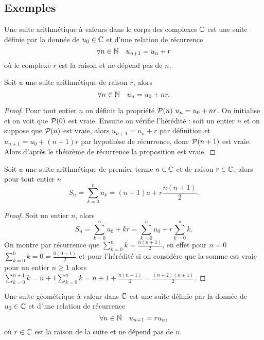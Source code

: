 \subsection{Exemples}
\begin{defdef}
  Une suite arithmétique à valeurs dans le corps des complexes $\C$ est une suite définie par la donnée de $u_0\in\C$ et d'une relation de récurrence 
  \begin{equation}
    \forall n \in \N \quad u_{n+1}=u_n+r
  \end{equation}
  où le complexe $r$ est la raison et ne dépend pas de $n$.
\end{defdef}
\begin{prop}
  Soit $u$ une suite arithmétique de raison $r$, alors
  \begin{equation}
    \forall n \in \N \quad u_n=u_0+nr.
  \end{equation}
\end{prop}
\begin{proof}
  Pour tout entier $n$ on définit la propriété $\P(n) \ u_n=u_0+nr$. On initialise et on voit que $\P(0)$ est vraie. Ensuite on vérifie l'hérédité : soit un entier $n$ et on suppose que $\P(n)$ est vraie, alors $u_{n+1}=u_n+r$ par définition et $u_{n+1}=u_0+(n+1)r$ par hypothèse de récurrence, donc $\P(n+1)$ est vraie. Alors d'après le théorème de récurrence la proposition est vraie.
\end{proof}
\begin{prop}
  Soit $u$ une suite arithmétique de premier terme $a\in\C$ et de raison $r\in\C$, alors pour tout entier $n$
  \begin{equation}
    S_n=\sum_{k=0}^n u_k=(n+1)a+r\frac{n(n+1)}{2}.
  \end{equation}
\end{prop}
\begin{proof}
  Soit un entier $n$, alors
  \begin{equation}
    S_n=\sum_{k=0}^n u_0+kr= \sum_{k=0}^n u_0 + r\sum_{k=0}^n k.
  \end{equation}
  On montre par récurrence que $\sum_{k=0}^n k=\frac{n(n+1)}{2}$, en effet pour $n=0$ $\sum_{k=0}^0 k=0=\frac{0(0+1)}{2}$ et pour l'hérédité si on considère que la somme est vraie pour un entier $n \geqslant 1$ alors $\sum_{k=0}^{n+1} k= n+1 \sum_{k=0}^n k=n+1+\frac{n(n+1)}{2}=\frac{(n+2)(n+1)}{2}$.
\end{proof}
\begin{defdef}
  Une suite géométrique à valeur dans $\C$ est une suite définie par la donnée de $u_0\in\C$ et d'une relation de récurrence
  \begin{equation}
    \forall n \in \N \quad u_{n+1}=ru_n,
  \end{equation}
  où $r\in\C$ est la raison de la suite et ne dépend pas de $n$.
\end{defdef}
